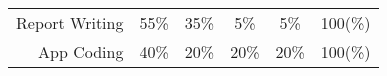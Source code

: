 \begin{table}[h]
\begin{tabular}{cccccc}
        \multicolumn{1}{r|}{Report Writing}
         & \multicolumn{1}{c|}{55\%}
         & \multicolumn{1}{c|}{35\%}
         & \multicolumn{1}{c|}{5\%}
         & \multicolumn{1}{c|}{5\%}
         & \multicolumn{1}{c|}{100(\%)}                    \\
        \cline{2-6}
        \multicolumn{1}{r|}{App Coding}
         & \multicolumn{1}{c|}{40\%}
         & \multicolumn{1}{c|}{20\%}
         & \multicolumn{1}{c|}{20\%}
         & \multicolumn{1}{c|}{20\%}
         & \multicolumn{1}{c|}{100(\%)}                    \\
        \cline{2-6}
    \end{tabular}
\end{table}
